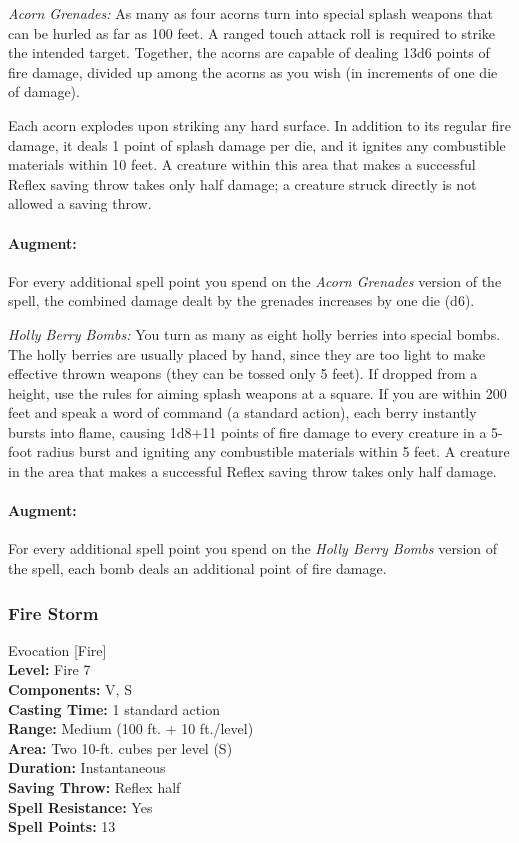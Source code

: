 \begin{list}{}{\leftmargin=1em}
 \item \emph{Acorn Grenades:} As many as four acorns turn into special splash weapons that can be hurled as far as 100 feet. A ranged touch attack roll is required to strike the intended target. Together, the acorns are capable of dealing 13d6 points of fire damage, divided up among the acorns as you wish (in increments of one die of damage).

Each acorn explodes upon striking any hard surface. In addition to its regular fire damage, it deals 1 point of splash damage per die, and it ignites any combustible materials within 10 feet. A creature within this area that makes a successful Reflex saving throw takes only half damage; a creature struck directly is not allowed a saving throw.
\paragraph{Augment:} For every additional spell point you spend on the \emph{Acorn Grenades} version of the spell, the combined damage dealt by the grenades increases by one die (d6).
 \item \emph{Holly Berry Bombs:} You turn as many as eight holly berries into special bombs. 
The holly berries are usually placed by hand, since they are too light to make effective thrown weapons (they can be tossed only 5 feet). If dropped from a height, use the rules for aiming splash weapons at a square. If you are within 200 feet and speak a word of command (a standard action), each berry instantly bursts into flame, causing 1d8+11 points of fire damage to every creature in a 5-foot radius burst and igniting any combustible materials within 5 feet. A creature in the area that makes a successful Reflex saving throw takes only half damage.
\paragraph{Augment:} For every additional spell point you spend on the \emph{Holly Berry Bombs} version of the spell, each bomb deals an additional point of fire damage.
\end{list}
\subsubsection{Fire Storm}
\label{Spell:FireStorm}
Evocation [Fire]
\\ \textbf{Level:} Fire 7
\\ \textbf{Components:} V, S
\\ \textbf{Casting Time:} 1 standard action
\\ \textbf{Range:} Medium (100 ft. + 10 ft./level)
\\ \textbf{Area:} Two 10-ft. cubes per level (S)
\\ \textbf{Duration:} Instantaneous
\\ \textbf{Saving Throw:} Reflex half
\\ \textbf{Spell Resistance:} Yes
\\ \textbf{Spell Points:} 13

